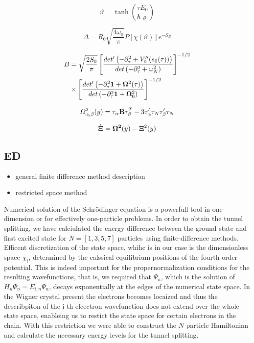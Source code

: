 \documentclass[prb,twocolumn,showpacs,preprintnumbers,amsmath,amssymb, superscriptaddress]{revtex4-2}
\newcommand{\1}{{1\hspace*{-0.5ex} \textrm{l} \hspace*{0.5ex}}}
\begin{document}
\begin{equation}
\vartheta = \tanh\left( \frac{\tau E_0}{\hbar \varrho} \right)
\end{equation}

\begin{equation}
\Delta = R_0 \sqrt{\frac{4\omega_0}{\pi}} P\left[ \textbf{$\chi$}(\vartheta) \right] e^{-S_E}
\end{equation}

\begin{align}
B &= \sqrt{ \frac{2S_0}{\pi}} \left[ \frac{det^\prime \left(-\partial_\tau^2 + V^{\prime \prime}_0 (s_0 (\tau))   \right)}{det\left(-\partial_\tau^2 + \omega^2_N   \right)}  \right]^{-1/2}\\
&\times \left[  \frac{det^\prime \left(-\partial_\tau^2 {\bf{1}} + {\bf{\Omega}}^2 (\tau)   \right)}{det\left(-\partial_\tau^2 {\bf{1}}+ {\bf{\Omega}}^2_0   \right)}   \right]^{-1/2}
\end{align}

\begin{equation}
\Omega^2_{\alpha, \beta} (y) = \tau_\alpha {\bf{B}} \tau_\beta^T - 3 \tau^\prime_\alpha \tau_N \tau^\prime_\beta \tau_N
\end{equation}

\begin{equation}
{\bf{\dot{\Xi}}} = {\bf{\Omega}^2}(y) - {\bf{\Xi}}^2(y)
\end{equation}

\subsection{ED}
\begin{itemize}
\item general finite difference method description
\item restricted space method
\end{itemize}


Numerical solution of the Schrödinger equation is a powerfull tool in one-dimension or for effectively one-particle problems. In order to obtain the tunnel splitting, we have calciulated the energy difference between the ground state and first excited state for $N = [1, 3, 5, 7]$ particles using finite-difference methods. Efficent discretization of the state space, whihc is in our case is the dimensionless space $\chi_i$, determined by the calssical equilibrium positions of the fourth order potential. This is indeed important for the propernormalization conditions for the resulting wavefunctions, that is, we required that $\Psi_n$, which is the solution of $H_n \Psi_n = E_{i, n} \Psi_n$, decays exponentially at the edges of the numerical state space. In the Wigner crystal present the electrons becomes locaized and thus the describpiton of the i-th elcectron wavefunction does not extend over the whole state space, enableing us to restict the state space for certain electrons in the chain. With this restriction we were able to construct the $N$ particle Hamiltonian and calculate the necessary energy levels for the tunnel splitting.
\end{document}
